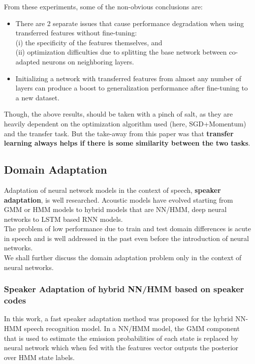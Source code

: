 From these experiments, some of the non-obvious conclusions are:
      \begin{itemize}
       \item There are 2 separate issues that cause performance degradation when using
    transferred features without fine-tuning:\\ 
    (i) the specificity of the features themselves, and\\
    (ii) optimization difficulties due to splitting the base network between co-adapted neurons on neighboring layers.
        \item Initializing a network with transferred features from almost any number of layers can produce a boost to generalization performance after fine-tuning to a new dataset.
      \end{itemize}
Though, the above results, should be taken with a pinch of salt, as they are heavily dependent on the optimization algorithm used (here, SGD+Momentum) and the transfer task. But the take-away from this paper was that \textbf{transfer learning always helps if there is some similarity between the two tasks}.

\subsection{Domain Adaptation}
\label{sec:domain}
Adaptation of neural network models in the context of speech, \textbf{speaker adaptation}, is well researched.  Acoustic models have evolved starting from GMM\cite{wiki:GMM} or HMM models to hybrid models that are NN/{HMM}\cite{wiki:HMM}, deep neural networks to LSTM\cite{olah} based RNN models.\\

The problem of low performance due to train and test domain differences is acute in speech and is well addressed in the past even before the introduction of neural networks.\\

We shall further discuss the domain adaptation problem only in the context of neural networks.

\subsubsection{Speaker Adaptation of hybrid NN/HMM based on speaker codes}
In this work\cite{6639211}, a fast speaker adaptation method was proposed for the hybrid NN-HMM speech recognition model. In a NN/HMM model, the GMM component that is used to estimate the emission probabilities of each state is replaced by neural network which when fed with the features vector outputs the posterior over HMM state labels.\\

